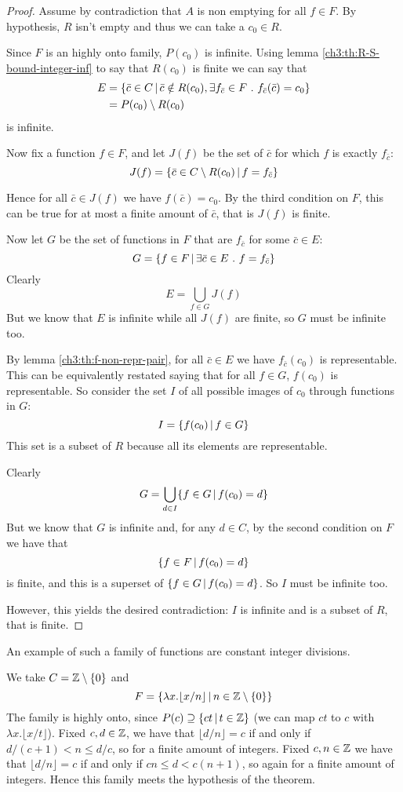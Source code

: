 \begin{proof}
	Assume by contradiction that $A$ is non emptying for all $f \in F$. By hypothesis, $R$ isn't empty and thus we can take a $c_0 \in R$.
	
	Since $F$ is an highly onto family, $P(c_0)$ is infinite. Using lemma \ref{ch3:th:R-S-bound-integer-inf} to say that $R(c_0)$ is finite we can say that
	\begin{align*}
		E &= \{ \bar{c} \in C \,\vert\, \bar{c} \notin R(c_0), \exists f_{\bar{c}} \in F\ .\ f_{\bar{c}}(\bar{c}) = c_0 \} \\
		&= P(c_0) \setminus R(c_0)
	\end{align*}
	is infinite.

	Now fix a function $f \in F$, and let $J(f)$ be the set of $\bar{c}$ for which $f$ is exactly $f_{\bar{c}}$:
	\[
	J(f) = \{ \bar{c} \in C \setminus R(c_0) \,\vert\, f = f_{\bar{c}} \}
	\]
	
	Hence for all $\bar{c} \in J(f)$ we have $f(\bar{c}) = c_0$. By the third condition on $F$, this can be true for at most a finite amount of $\bar{c}$, that is $J(f)$ is finite.

	Now let $G$ be the set of functions in $F$ that are $f_{\bar{c}}$ for some $\bar{c} \in E$:
	\[
	G = \{ f \in F \,\vert\, \exists \bar{c} \in E\ .\ f = f_{\bar{c}} \}
	\]
	Clearly
	\[
	E = \bigcup\limits_{f \in G} J(f)
	\]
	But we know that $E$ is infinite while all $J(f)$ are finite, so $G$ must be infinite too.

	By lemma \ref{ch3:th:f-non-repr-pair}, for all $\bar{c} \in E$ we have $f_{\bar{c}}(c_0)$ is representable. This can be equivalently restated saying that for all $f \in G$, $f(c_0)$ is representable.
	So consider the set $I$ of all possible images of $c_0$ through functions in $G$:
	\[
	I = \{ f(c_0) \,\vert\, f \in G \}	
	\]
	This set is a subset of $R$ because all its elements are representable.
	
	Clearly
	\[
	G = \bigcup\limits_{d \in I} \{ f \in G \,\vert\, f(c_0) = d \}
	\]
	But we know that $G$ is infinite and, for any $d \in C$, by the second condition on $F$ we have that
	\[
	\{ f \in F \,\vert\, f(c_0) = d \}
	\]
	is finite, and this is a superset of $\{ f \in G \,\vert\, f(c_0) = d \}$. So $I$ must be infinite too.
	
	However, this yields the desired contradiction: $I$ is infinite and is a subset of $R$, that is finite.
\end{proof}

An example of such a family of functions are constant integer divisions.
\begin{example}
	We take $C = \mathbb{Z} \setminus \{ 0 \}$ and
	\[
	F = \{ \lambda x. \lfloor x / n \rfloor \,\vert\, n \in \mathbb{Z} \setminus \{ 0 \}\}
	\]
	The family is highly onto, since $P(c) \supseteq \{ ct \,\vert\, t \in \mathbb{Z} \}$ (we can map $ct$ to $c$ with $\lambda x. \lfloor x / t \rfloor$).
	Fixed $c, d \in \mathbb{Z}$, we have that $\lfloor d / n \rfloor = c$ if and only if $d / (c+1) < n \le d / c$, so for a finite amount of integers.
	Fixed $c, n \in \mathbb{Z}$ we have that $\lfloor d / n \rfloor = c$ if and only if $c n \le d < c (n + 1)$, so again for a finite amount of integers.
	Hence this family meets the hypothesis of the theorem.
\end{example}

